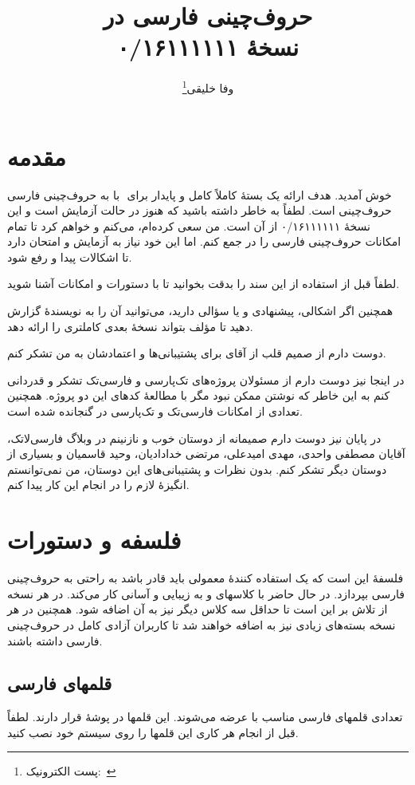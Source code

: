 \documentclass[a4paper,11pt]{refrep}
\title{حروف‌چینی فارسی در \lr{\XePersian}\\[0.2cm]نسخهٔ ۰/۱۶۱۱۱۱۱۱}
\author{وفا خلیقی\thanks{پست الکترونیک:~\lr{vafa.khalighi@students.mq.edu.au}}}
\begin{document}
\maketitle
\tableofcontents
\chapter{مقدمه}
به حروف‌چینی فارسی ‪ ‬با ‪\lr{\XePersian} ‬خوش آمدید. هدف \lr{\XePersian} ارائه یک بستهٔ کاملاً کامل و پایدار برای حروف‌چینی است. لطفاً به خاطر داشته باشید که \lr{\XePersian} هنوز در حالت آزمایش است و این نسخهٔ ۰/۱۶۱۱۱۱۱۱ از آن است. من سعی کرده‌ام، می‌کنم و خواهم کرد تا تمام امکانات حروف‌چینی فارسی را در \lr{\XePersian} جمع کنم. اما این خود نیاز به آزمایش و امتحان دارد تا اشکالات پیدا و رفع شود.


لطفاً قبل از استفاده از \lr{\XePersian} این سند را بدقت بخوانید تا با دستورات و امکانات \lr{\XePersian} آشنا شوید.

همچنین اگر اشکالی، پیشنهادی و یا سؤالی دارید، می‌توانید آن را به نویسندهٔ \lr{\XePersian} گزارش دهید تا مؤلف \lr{\XePersian} بتواند نسخهٔ بعدی کاملتری را ارائه دهد.

دوست دارم از صمیم قلب از آقای  برای پشتیبانی‌ها و اعتمادشان به من تشکر کنم.

در اینجا نیز دوست دارم از مسئولان پروژه‌های تک‌پارسی و فارسی‌تک تشکر و قدردانی کنم به این خاطر که نوشتن \lr{\XePersian} ممکن نبود مگر با مطالعهٔ کدهای این دو پروژه. همچنین تعدادی از امکانات فارسی‌تک و  تک‌پارسی در \lr{\XePersian} گنجانده شده است.

در پایان نیز دوست دارم صمیمانه از دوستان خوب و نازنینم در وبلاگ فارسی‌لاتک، آقایان مصطفی واحدی، مهدی امیدعلی، مرتضی خدادادیان، وحید قاسمیان و بسیاری از دوستان دیگر تشکر کنم. بدون نظرات و پشتیبانی‌های این دوستان، من نمی‌توانستم انگیزهٔ لازم را در انجام این کار پیدا کنم.
\chapter{فلسفه و دستورات}
فلسفهٔ \lr{\XePersian} این است که یک استفاده کنندهٔ معمولی باید قادر باشد به راحتی به حروف‌چینی فارسی بپردازد. در حال حاضر \lr{\XePersian} با کلاسهای  و  به زیبایی و آسانی کار می‌کند. در هر نسخه از \lr{\XePersian} تلاش بر این است تا حداقل سه کلاس دیگر نیز به آن اضافه شود. همچنین در هر نسخه بسته‌های زیادی نیز به \lr{\XePersian} اضافه خواهند شد تا کاربران آزادی کامل در حروف‌چینی فارسی داشته باشند.

\section{قلمهای فارسی}
تعدادی قلمهای فارسی مناسب با \lr{\XePersian} عرضه می‌شوند. این قلمها در پوشهٔ  قرار دارند. لطفاً قبل از انجام هر کاری این قلمها را روی سیستم خود نصب کنید.
\end{document}
